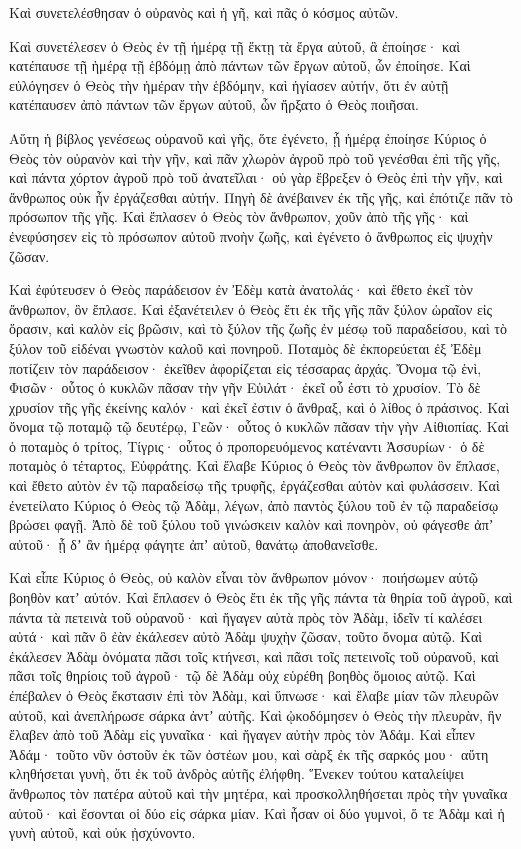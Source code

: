 {Καὶ συνετελέσθησαν ὁ οὐρανὸς καὶ ἡ γῆ, καὶ πᾶς ὁ κόσμος αὐτῶν.
\par }{\PP {}Καὶ συνετέλεσεν ὁ Θεὸς ἐν τῇ ἡμέρᾳ τῇ ἕκτῃ τὰ ἔργα αὐτοῦ, ἃ ἐποίησε· καὶ κατέπαυσε τῇ ἡμέρᾳ τῇ ἑβδόμῃ ἀπὸ πάντων τῶν ἔργων αὐτοῦ, ὧν ἐποίησε.
Καὶ εὐλόγησεν ὁ Θεὸς τὴν ἡμέραν τὴν ἑβδόμην, καὶ ἡγίασεν αὐτήν, ὅτι ἐν αὐτῇ κατέπαυσεν ἀπὸ πάντων τῶν ἔργων αὐτοῦ, ὧν ἤρξατο ὁ Θεὸς ποιῆσαι.
\par }{\PP {}Αὕτη ἡ βίβλος γενέσεως οὐρανοῦ καὶ γῆς, ὅτε ἐγένετο, ᾗ ἡμέρᾳ ἐποίησε Κύριος ὁ Θεὸς τὸν οὐρανὸν καὶ τὴν γῆν,
καὶ πᾶν χλωρὸν ἀγροῦ πρὸ τοῦ γενέσθαι ἐπὶ τῆς γῆς, καὶ πάντα χόρτον ἀγροῦ πρὸ τοῦ ἀνατεῖλαι· οὐ γὰρ ἔβρεξεν ὁ Θεὸς ἐπὶ τὴν γῆν, καὶ ἄνθρωπος οὐκ ἦν ἐργάζεσθαι αὐτήν.
Πηγὴ δὲ ἀνέβαινεν ἐκ τῆς γῆς, καὶ ἐπότιζε πᾶν τὸ πρόσωπον τῆς γῆς.
Καὶ ἔπλασεν ὁ Θεὸς τὸν ἄνθρωπον, χοῦν ἀπὸ τῆς γῆς· καὶ ἐνεφύσησεν εἰς τὸ πρόσωπον αὐτοῦ πνοὴν ζωῆς, καὶ ἐγένετο ὁ ἄνθρωπος εἰς ψυχὴν ζῶσαν.
\par }{\PP {}Καὶ ἐφύτευσεν ὁ Θεὸς παράδεισον ἐν Ἐδὲμ κατὰ ἀνατολάς· καὶ ἔθετο ἐκεῖ τὸν ἄνθρωπον, ὃν ἔπλασε.
Καὶ ἐξανέτειλεν ὁ Θεὸς ἔτι ἐκ τῆς γῆς πᾶν ξύλον ὡραῖον εἰς ὅρασιν, καὶ καλὸν εἰς βρῶσιν, καὶ τὸ ξύλον τῆς ζωῆς ἐν μέσῳ τοῦ παραδείσου, καὶ τὸ ξύλον τοῦ εἰδέναι γνωστὸν καλοῦ καὶ πονηροῦ.
Ποταμὸς δὲ ἐκπορεύεται ἐξ Ἐδὲμ ποτίζειν τὸν παράδεισον· ἐκεῖθεν ἀφορίζεται εἰς τέσσαρας ἀρχάς.
Ὄνομα τῷ ἑνὶ, Φισῶν· οὗτος ὁ κυκλῶν πᾶσαν τὴν γῆν Εὐιλάτ· ἐκεῖ οὗ ἐστι τὸ χρυσίον.
Τὸ δὲ χρυσίον τῆς γῆς ἐκείνης καλόν· καὶ ἐκεῖ ἐστιν ὁ ἄνθραξ, καὶ ὁ λίθος ὁ πράσινος.
Καὶ ὄνομα τῷ ποταμῷ τῷ δευτέρῳ, Γεῶν· οὗτος ὁ κυκλῶν πᾶσαν τὴν γὴν Αἰθιοπίας.
Καὶ ὁ ποταμὸς ὁ τρίτος, Τίγρις· οὗτος ὁ προπορευόμενος κατέναντι Ἀσσυρίων· ὁ δὲ ποταμὸς ὁ τέταρτος, Εὐφράτης.
Καὶ ἔλαβε Κύριος ὁ Θεὸς τὸν ἄνθρωπον ὃν ἔπλασε, καὶ ἔθετο αὐτὸν ἐν τῷ παραδείσῳ τῆς τρυφῆς, ἐργάζεσθαι αὐτὸν καὶ φυλάσσειν.
Καὶ ἐνετείλατο Κύριος ὁ Θεὸς τῷ Ἀδὰμ, λέγων, ἀπὸ παντὸς ξύλου τοῦ ἐν τῷ παραδείσῳ βρώσει φαγῇ.
Ἀπὸ δὲ τοῦ ξύλου τοῦ γινώσκειν καλὸν καὶ πονηρὸν, οὐ φάγεσθε ἀπʼ αὐτοῦ· ᾗ δʼ ἂν ἡμέρᾳ φάγητε ἀπʼ αὐτοῦ, θανάτῳ ἀποθανεῖσθε.
\par }{\PP {}Καὶ εἶπε Κύριος ὁ Θεὸς, οὐ καλὸν εἶναι τὸν ἄνθρωπον μόνον· ποιήσωμεν αὐτῷ βοηθὸν κατʼ αὐτόν.
Καὶ ἔπλασεν ὁ Θεὸς ἔτι ἐκ τῆς γῆς πάντα τὰ θηρία τοῦ ἀγροῦ, καὶ πάντα τὰ πετεινὰ τοῦ οὐρανοῦ· καὶ ἤγαγεν αὐτὰ πρὸς τὸν Ἀδὰμ, ἰδεῖν τί καλέσει αὐτά· καὶ πᾶν ὃ ἐὰν ἐκάλεσεν αὐτὸ Ἀδὰμ ψυχὴν ζῶσαν, τοῦτο ὄνομα αὐτῷ.
Καὶ ἐκάλεσεν Ἀδὰμ ὀνόματα πᾶσι τοῖς κτήνεσι, καὶ πᾶσι τοῖς πετεινοῖς τοῦ οὐρανοῦ, καὶ πᾶσι τοῖς θηρίοις τοῦ ἀγροῦ· τῷ δὲ Ἀδὰμ οὐχ εὑρέθη βοηθὸς ὅμοιος αὐτῷ.
Καὶ ἐπέβαλεν ὁ Θεὸς ἔκστασιν ἐπὶ τὸν Ἀδὰμ, καὶ ὕπνωσε· καὶ ἔλαβε μίαν τῶν πλευρῶν αὐτοῦ, καὶ ἀνεπλήρωσε σάρκα ἀντʼ αὐτῆς.
Καὶ ᾠκοδόμησεν ὁ Θεὸς τὴν πλευρὰν, ἣν ἔλαβεν ἀπὸ τοῦ Ἀδὰμ εἰς γυναῖκα· καὶ ἤγαγεν αὐτὴν πρὸς τὸν Ἀδάμ.
Καὶ εἶπεν Ἀδάμ· τοῦτο νῦν ὀστοῦν ἐκ τῶν ὀστέων μου, καὶ σὰρξ ἐκ τῆς σαρκός μου· αὕτη κληθήσεται γυνὴ, ὅτι ἐκ τοῦ ἀνδρὸς αὐτῆς ἐλήφθη.
Ἕνεκεν τούτου καταλείψει ἄνθρωπος τὸν πατέρα αὐτοῦ καὶ τὴν μητέρα, καὶ προσκολληθήσεται πρὸς τὴν γυναῖκα αὐτοῦ· καὶ ἔσονται οἱ δύο εἰς σάρκα μίαν.
Καὶ ἦσαν οἱ δύο γυμνοὶ, ὅ τε Ἀδὰμ καὶ ἡ γυνὴ αὐτοῦ, καὶ οὐκ ᾐσχύνοντο.

}
